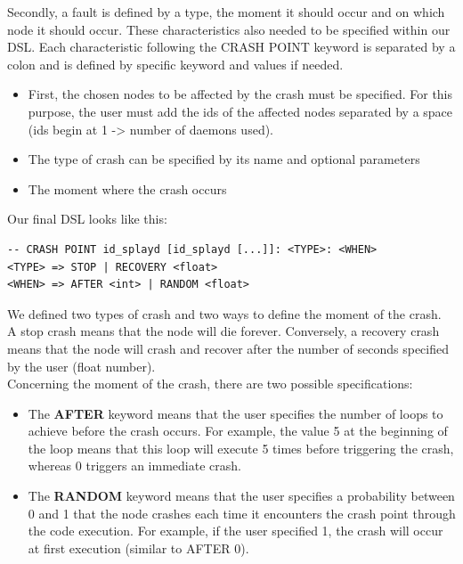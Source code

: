 \documentclass{eplmastersthesis}
\begin{document}
        Secondly, a fault is defined by a type, the moment it should occur and
        on which node it should occur. These characteristics also needed to
        be specified within our DSL. Each characteristic following the
        \textsc{CRASH POINT} keyword is separated by a colon and is defined
        by specific keyword and values if needed.

        \begin{itemize}
          \item First, the chosen nodes to be affected by the crash must be
          specified. For this purpose, the user must add the ids of the
          affected nodes separated by a space (ids begin at 1 -> number of
          daemons used).
          \item The type of crash can be specified by its name and optional
          parameters
          \item The moment where the crash occurs
        \end{itemize}

        Our final DSL looks like this:

        \begin{lstlisting}[style=MyBash]
-- CRASH POINT id_splayd [id_splayd [...]]: <TYPE>: <WHEN>
<TYPE> => STOP | RECOVERY <float>
<WHEN> => AFTER <int> | RANDOM <float>
        \end{lstlisting}

        We defined two types of crash and two ways to
        define the moment of the crash.\\
        A stop crash means that the node will die forever. Conversely, a
        recovery crash means that the node will crash and recover after the
        number of seconds specified by the user (float number).\\
        Concerning the moment of the crash, there are two possible specifications:

        \begin{itemize}
          \item The \textbf{AFTER} keyword means that the user specifies the
          number of loops to achieve before the crash occurs. For example,
          the value 5 at the beginning of the loop means that this loop will
          execute 5 times before triggering the crash, whereas 0 triggers
          an immediate crash.
          \item The \textbf{RANDOM} keyword means that the user specifies a
          probability between 0 and 1 that the node crashes each time it
          encounters the crash point through the code execution. For example,
          if the user specified 1, the crash will occur at first execution
          (similar to AFTER 0).
        \end{itemize}
\end{document}
